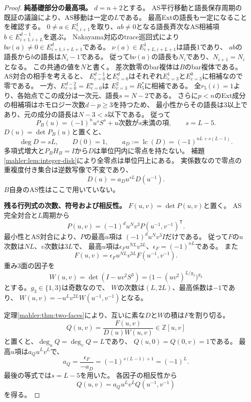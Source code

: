 \documentclass[11pt,a4paper]{ltjsarticle}
\theoremstyle{definition}
\begin{document}
\begin{proof}
\par\smallskip\noindent\textbf{純基礎部分の最高項。}\quad
$d=n+2$とする。
AS平行移動と語長保存周期の既証の議論により、AS移動は一定の$L$である。
最高Extの語長も一定になることを確認する。
$0\ne a\in E^1_{i,i+1}$を取り、$ab\ne0$となる語長斉次なAS相補項
$b\in E^{d-1}_{i+1,i+L}$を選ぶ。
Nakayama対応のtrace巡回式により
$b\nu(a)\ne0\in E^d_{i+1,i+L+1}$である。
$\nu(a)\in E^1_{i+L,i+L+1}$は語長1であり、
$ab$の語長から$b$の語長は$N_i-1$である。
従って$b\nu(a)$の語長も$N_i$であり、$N_{i+1}=N_i$となる。
この共通の値を$N$と書く。
差次数零のbar複体は$B$のbar複体である。
AS対合の相手を考えると、
$E^{d-1}_{e=0}$と$E^d_{e=0}$はそれぞれ$E^1_{e=3}$と$E^0_{e=3}$に相補なので零である。
一方、$E^{d-2}_{e=0}=E^n_{e=0}$は
$E^2_{e=3}=R_5^*$に相補である。
全$r_5(i)=1$より、各始点でこの成分は一次元、語長$s=N-2$である。
さらに$p<n$のExt成分の相補項はホモロジー次数$d-p\ge3$を持つため、
最小性からその語長は3以上であり、元の成分の語長は$N-3<s$以下である。
従って
\[
 P_B(u)=(-1)^n u^sS^s+\text{$u$次数が$s$未満の項},
 \qquad s=L-5.
\]
$D(u)=\det P_B(u)$と置くと、
\[
 \deg D=sL,\qquad D(0)=1,\qquad
 a_D:=\operatorname{lc}(D)=(-1)^{nL+s(L-1)}.
\]
多項式増大と$P_BH_B=I$から$D$は単位円内に零点を持たない。
補題\ref{mahler:lem:integer-disk}により全零点は単位円上にある。
実係数なので零点の重複度付き集合は逆数写像で不変であり、
\begin{equation}\label{genidx:eq:d3-pure-reciprocity}
 D(u)=a_Du^{sL}D(u^{-1}).
\end{equation}
$B$自身のAS性はここで用いていない。

\par\smallskip\noindent\textbf{残る行列式の次数、符号および相反性。}\quad
$F(u,v)=\det P(u,v)$と置く。
AS完全対合と$L$周期から
\[
 P(u,v)=(-1)^d u^Nv^3P(u^{-1},v^{-1})^{\mathsf T}.
\]
最小性とAS対合により、$P$の最高$u$項は
$(-1)^du^Nv^3I$だけである。
従って$F$の$u$次数は$NL$、$v$次数は$3L$で、
最高$u$項は$\epsilon_Fu^{NL}v^{3L}$、$\epsilon_F=(-1)^{nL}$である。
また
\[
 F(u,v)=\epsilon_Fu^{NL}v^{3L}F(u^{-1},v^{-1}).
\]
重み3面の因子を
\[
 W(u,v)=\det(I-uv^2S^3)
       =\bigl(1-(uv^2)^{L/g_3}\bigr)^{g_3}
\]
とする。$g_3\in\{1,3\}$は奇数なので、
$W$の次数は$(L,2L)$、最高係数は$-1$であり、
$W(u,v)=-u^Lv^{2L}W(u^{-1},v^{-1})$となる。

定理\ref{mahler:thm:two-faces}により、互いに素な$D$と$W$の積は$F$を割り切る。
\[
 Q(u,v)=\frac{F(u,v)}{D(u)W(u,v)}\in\mathbb Z[u,v]
\]
と置くと、$\deg_uQ=\deg_vQ=L$であり、
$Q(u,0)=Q(0,v)=1$である。
最高$u$項は$a_Qu^Lv^L$で、
\[
 a_Q=\frac{\epsilon_F}{-a_D}
     =(-1)^{s(L-1)+1}=(-1)^L.
\]
最後の等式では$s=L-5$を用いた。
各因子の相反性から
\begin{equation}\label{genidx:eq:d3-quotient-reciprocity}
 Q(u,v)=a_Qu^Lv^LQ(u^{-1},v^{-1})
\end{equation}
を得る。


\end{proof}
\end{document}
